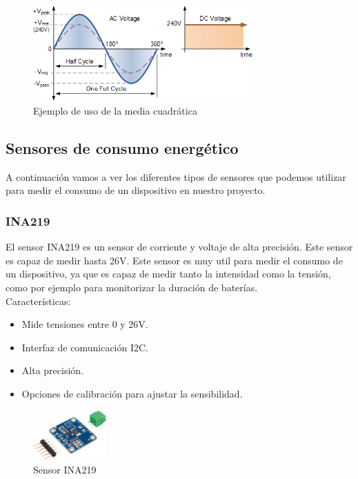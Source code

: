 \begin{titlepage}
\begin{figure}[h!]
	\centering
	\includegraphics[width=0.75\textwidth]{imagenes/voltage_rms_example.png}
	\caption{Ejemplo de uso de la media cuadrática\cite{rms_voltage_equivalent_img}}
\end{figure}

\subsection{Sensores de consumo energético}
A continuación vamos a ver los diferentes tipos de sensores que podemos utilizar para medir el consumo de un dispositivo en nuestro proyecto. \\
\subsubsection{INA219}
El sensor INA219\cite{ref5} es un sensor de corriente y voltaje de alta precisión. Este sensor es capaz de medir hasta 26V. Este sensor es muy util para medir el consumo de un dispositivo, ya que es capaz de medir tanto la intensidad como la tensión, como por ejemplo para monitorizar la duración de baterías.\\

Características:
\begin{itemize}
	\item Mide tensiones entre 0 y 26V.
	\item Interfaz de comunicación I2C.
	\item Alta precisión.
	\item Opciones de calibración para ajustar la sensibilidad.
\end{itemize}
\begin{figure}[h!]
	\centering
	\includegraphics[width=0.25\textwidth]{imagenes/ina219.png}
	\caption{Sensor INA219\cite{ina219_img}}
\end{figure}


\end{titlepage}
